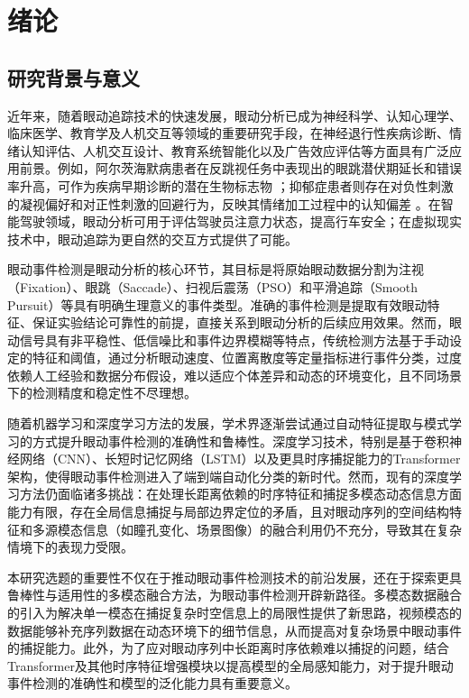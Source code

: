 \documentclass{xdupgthesis}
\begin{document}
\chapter{绪论}

\section{研究背景与意义}

近年来，随着眼动追踪技术的快速发展，眼动分析已成为神经科学、认知心理学、临床医学、教育学及人机交互等领域的重要研究手段，在神经退行性疾病诊断、情绪认知评估、人机交互设计、教育系统智能化以及广告效应评估等方面具有广泛应用前景。例如，阿尔茨海默病患者在反跳视任务中表现出的眼跳潜伏期延长和错误率升高，可作为疾病早期诊断的潜在生物标志物 \cite{readman2021potential}；抑郁症患者则存在对负性刺激的凝视偏好和对正性刺激的回避行为，反映其情绪加工过程中的认知偏差 \cite{noyes2023eye}。在智能驾驶领域，眼动分析可用于评估驾驶员注意力状态，提高行车安全；在虚拟现实技术中，眼动追踪为更自然的交互方式提供了可能。

眼动事件检测是眼动分析的核心环节，其目标是将原始眼动数据分割为注视（Fixation）、眼跳（Saccade）、扫视后震荡（PSO）和平滑追踪（Smooth Pursuit）等具有明确生理意义的事件类型。准确的事件检测是提取有效眼动特征、保证实验结论可靠性的前提，直接关系到眼动分析的后续应用效果。然而，眼动信号具有非平稳性、低信噪比和事件边界模糊等特点，传统检测方法基于手动设定的特征和阈值，通过分析眼动速度、位置离散度等定量指标进行事件分类，过度依赖人工经验和数据分布假设，难以适应个体差异和动态的环境变化，且不同场景下的检测精度和稳定性不尽理想。

随着机器学习和深度学习方法的发展，学术界逐渐尝试通过自动特征提取与模式学习的方式提升眼动事件检测的准确性和鲁棒性。深度学习技术，特别是基于卷积神经网络（CNN）、长短时记忆网络（LSTM）以及更具时序捕捉能力的Transformer架构，使得眼动事件检测进入了端到端自动化分类的新时代。然而，现有的深度学习方法仍面临诸多挑战：在处理长距离依赖的时序特征和捕捉多模态动态信息方面能力有限，存在全局信息捕捉与局部边界定位的矛盾，且对眼动序列的空间结构特征和多源模态信息（如瞳孔变化、场景图像）的融合利用仍不充分，导致其在复杂情境下的表现力受限。

本研究选题的重要性不仅在于推动眼动事件检测技术的前沿发展，还在于探索更具鲁棒性与适用性的多模态融合方法，为眼动事件检测开辟新路径。多模态数据融合的引入为解决单一模态在捕捉复杂时空信息上的局限性提供了新思路，视频模态的数据能够补充序列数据在动态环境下的细节信息，从而提高对复杂场景中眼动事件的捕捉能力。此外，为了应对眼动序列中长距离时序依赖难以捕捉的问题，结合Transformer及其他时序特征增强模块以提高模型的全局感知能力，对于提升眼动事件检测的准确性和模型的泛化能力具有重要意义。
\end{document}
